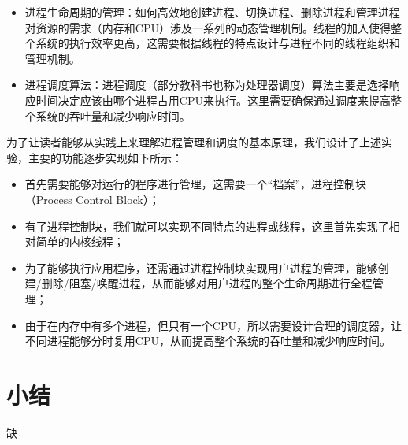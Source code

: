 \begin{itemize}
\item
  进程生命周期的管理：如何高效地创建进程、切换进程、删除进程和管理进程对资源的需求（内存和CPU）涉及一系列的动态管理机制。线程的加入使得整个系统的执行效率更高，这需要根据线程的特点设计与进程不同的线程组织和管理机制。
\item
  进程调度算法：进程调度（部分教科书也称为处理器调度）算法主要是选择响应时间决定应该由哪个进程占用CPU来执行。这里需要确保通过调度来提高整个系统的吞吐量和减少响应时间。
\end{itemize}

为了让读者能够从实践上来理解进程管理和调度的基本原理，我们设计了上述实验，主要的功能逐步实现如下所示：

\begin{itemize}
\item
  首先需要能够对运行的程序进行管理，这需要一个``档案''，进程控制块（Process
  Control Block）；
\item
  有了进程控制块，我们就可以实现不同特点的进程或线程，这里首先实现了相对简单的内核线程；
\item
  为了能够执行应用程序，还需通过进程控制块实现用户进程的管理，能够创建/删除/阻塞/唤醒进程，从而能够对用户进程的整个生命周期进行全程管理；
\item
  由于在内存中有多个进程，但只有一个CPU，所以需要设计合理的调度器，让不同进程能够分时复用CPU，从而提高整个系统的吞吐量和减少响应时间。
\end{itemize}

%
%
%
%
%
%
%

\section{小结}
缺
